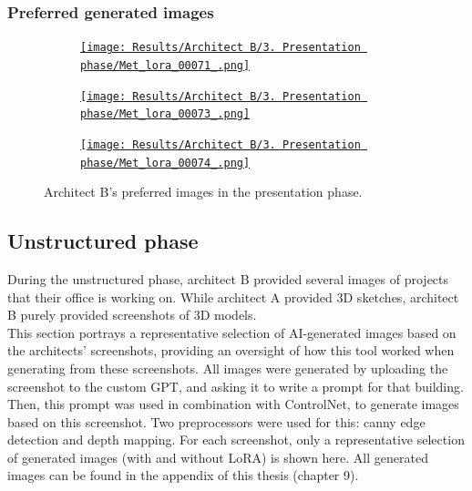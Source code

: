 \subsubsection{Preferred generated images}
\begin{figure}[H]
    \centering
    \begin{subfigure}[b]{0.3\textwidth}
        \centering
        \href{https://github.com/matijspeeters/Thesis/blob/main/Images/Results/Architect%20B/3.%20Presentation%20phase/Met_lora_00071_.png}{\texttt{[image: Results/Architect B/3. Presentation phase/Met\_lora\_00071\_.png]}}
        \caption{}
        \label{fig:B-presentation-preferred-a}
    \end{subfigure}
    \hfill
    \begin{subfigure}[b]{0.3\textwidth}
        \centering
        \href{https://github.com/matijspeeters/Thesis/blob/main/Images/Results/Architect%20B/3.%20Presentation%20phase/Met_lora_00073_.png}{\texttt{[image: Results/Architect B/3. Presentation phase/Met\_lora\_00073\_.png]}}
        \caption{}
        \label{fig:B-presentation-preferred-b}
    \end{subfigure}
    \hfill
    \begin{subfigure}[b]{0.3\textwidth}
        \centering
        \href{https://github.com/matijspeeters/Thesis/blob/main/Images/Results/Architect%20B/3.%20Presentation%20phase/Met_lora_00074_.png}{\texttt{[image: Results/Architect B/3. Presentation phase/Met\_lora\_00074\_.png]}}
        \caption{}
        \label{fig:B-presentation-preferred-c}
    \end{subfigure}
    \caption{Architect B's preferred images in the presentation phase.}
    \label{fig:B-presentation-preferred}
\end{figure}

\subsection{Unstructured phase}
During the unstructured phase, architect B provided several images of projects that
their office is working on. While architect A provided 3D sketches, architect B purely provided screenshots of 3D models.\\
This section portrays a representative selection of AI-generated images based on the architects’ screenshots, providing an oversight of how this tool worked when generating from these screenshots.
All images were generated by uploading the screenshot to the custom GPT, and asking it
to write a prompt for that building. Then, this prompt was used in combination with
ControlNet, to generate images based on this screenshot. Two preprocessors were used for
this: canny edge detection and depth mapping.
For each screenshot, only a representative selection of generated images (with and without
LoRA) is shown here. All generated images can be found in the appendix of this thesis
(chapter 9).
